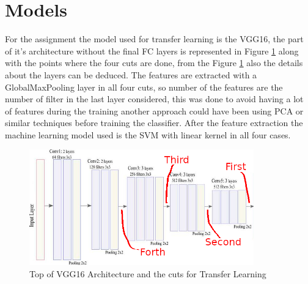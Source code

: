 \documentclass[12pt,a4paper]{article}
\begin{document}
\section*{Models}
For the assignment the model used for transfer learning is the VGG16, the part of it's architecture without the final FC layers is represented in Figure \ref{fig:VGG16} along with the points where the four cuts are done, from the Figure \ref{fig:VGG16} also the details about the layers can be deduced.
The features are extracted with a GlobalMaxPooling layer in all four cuts, so number of the features are the number of filter in the last layer considered, this was done to avoid having a lot of features during the training another approach could have been using PCA or similar techniques before training the classifier.
After the feature extraction the machine learning model used is the SVM with linear kernel in all four cases.
\begin{figure}[!h]
  \centering
  \includegraphics[width=\linewidth, height=5cm]{imgs/VGG16.png}
  \caption{Top of VGG16 Architecture and the cuts for Transfer Learning}
  \label{fig:VGG16}
\end{figure}
\end{document}
